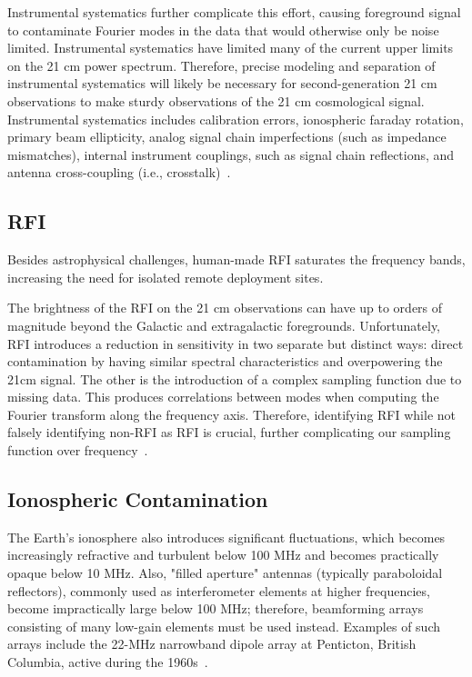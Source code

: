 	    Instrumental systematics further complicate this effort, causing foreground signal to contaminate Fourier modes in the data that would otherwise only be noise limited. Instrumental systematics have limited many of the current upper limits on the 21 cm power spectrum. Therefore, precise modeling and separation of instrumental systematics will likely be necessary for second-generation 21 cm observations to make sturdy observations of the 21 cm cosmological signal. Instrumental systematics includes calibration errors, ionospheric faraday rotation, primary beam ellipticity, analog signal chain imperfections (such as impedance mismatches), internal instrument couplings, such as signal chain reflections, and antenna cross-coupling (i.e., crosstalk)~\citep{2020ApJ...888...70K}.
	    
	    
	    
	    \subsection*{RFI}
	    
	    Besides astrophysical challenges, human-made RFI saturates the frequency bands, increasing the need for isolated remote deployment sites. 
	    
	    The brightness of the RFI on the 21 cm observations can have up to orders of magnitude beyond the Galactic and extragalactic foregrounds. Unfortunately, RFI introduces a reduction in sensitivity in two separate but distinct ways: direct contamination by having similar spectral characteristics and overpowering the 21cm signal. The other is the introduction of a complex sampling function due to missing data. This produces correlations between modes when computing the Fourier transform along the frequency axis. Therefore,  identifying RFI while not falsely identifying non-RFI as RFI is crucial, further complicating our sampling function over frequency~\citep{2019MNRAS.488.2605K}.
	    
	    \subsection*{Ionospheric Contamination}
	    
	    The Earth's ionosphere also introduces significant fluctuations, which becomes increasingly refractive and turbulent below 100 MHz and becomes practically opaque below 10 MHz. Also, "filled aperture" antennas (typically paraboloidal reflectors), commonly used as interferometer elements at higher frequencies, become impractically large below 100 MHz; therefore, beamforming arrays consisting of many low-gain elements must be used instead. Examples of such arrays include the 22-MHz narrowband dipole array at Penticton, British Columbia, active during the 1960s~\citep{2005ITAP...53.2480E}.\\
	    
